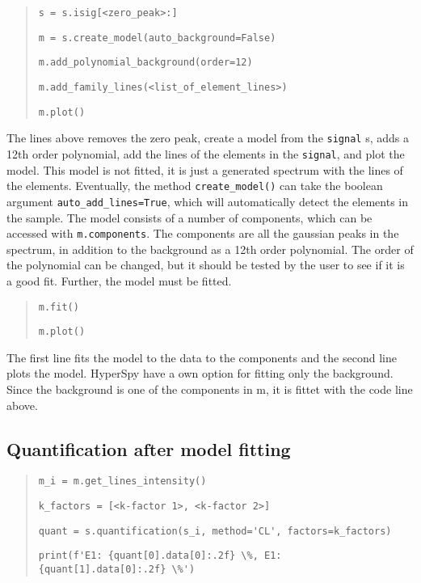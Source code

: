 \begin{quote}
    \verb|s = s.isig[<zero_peak>:]|

    \verb|m = s.create_model(auto_background=False)|

    \verb|m.add_polynomial_background(order=12)|

    \verb|m.add_family_lines(<list_of_element_lines>)|

    \verb|m.plot()|

\end{quote}

The lines above removes the zero peak, create a model from the \verb|signal| s, adds a 12th order polynomial, add the lines of the elements in the \verb|signal|, and plot the model.
This model is not fitted, it is just a generated spectrum with the lines of the elements.
Eventually, the method \verb|create_model()| can take the boolean argument \verb|auto_add_lines=True|, which will automatically detect the elements in the sample.
The model consists of a number of components, which can be accessed with \verb|m.components|.
The components are all the gaussian peaks in the spectrum, in addition to the background as a 12th order polynomial.
The order of the polynomial can be changed, but it should be tested by the user to see if it is a good fit.
Further, the model must be fitted.

\begin{quote}
    \verb|m.fit()|


    \verb|m.plot()|
\end{quote}

The first line fits the model to the data to the components and the second line plots the model.
HyperSpy have a own option for fitting only the background.
Since the background is one of the components in m, it is fittet with the code line above.


\subsection{Quantification after model fitting}
\label{sec:results:steps:quantification:model}

\begin{quote}
    \verb|m_i = m.get_lines_intensity()|

    \verb|k_factors = [<k-factor 1>, <k-factor 2>] |

    \verb|quant = s.quantification(s_i, method='CL', factors=k_factors)|

    \verb|print(f'E1: {quant[0].data[0]:.2f} \%, E1: {quant[1].data[0]:.2f} \%')|

\end{quote}

